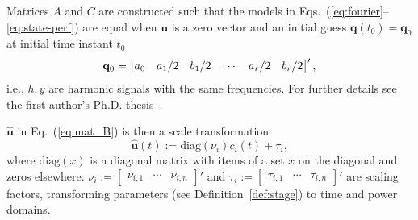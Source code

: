 \documentclass[letterpaper,10pt,journal,twoside]{IEEEtran}
\theoremstyle{definition}
\newtheorem{lem}[thm]{Lemma}
\begin{document}
{\color{blue}Matrices $A$ and $C$ are constructed such that t}he %
models in Eqs.~(\ref{eq:fourier}--\ref{eq:state-perf}) are equal
when $\mathbf{u}$ is a zero vector %
and an initial guess $\mathbf{q}(t_0)=\mathbf{q}_0$ at initial time instant $t_0$
  {\color{blue}\begin{equation}
  {\color{black}\mathbf{q}_0=\begin{bmatrix}a_0 & a_1/2 & b_1/2 & \cdots & a_r/2 & b_r/2\end{bmatrix}',}
  \end{equation}}
i.e., $h,y$ are %
harmonic signals with the same frequencies{\color{blue}. For further details see the first author's Ph.D. thesis~\cite{seewaldphdthesis}}.

$\hat{\mathbf{u}}$ in Eq.~(\ref{eq:mat_B}) is then a scale transformation
\begin{equation}
  \hat{\mathbf{u}}(t):=\mathrm{diag}(\nu_i)c_i(t)+\tau_i,
\end{equation}
where $\mathrm{diag}(x)$ is a diagonal matrix with items of a set $x$ on the diagonal and zeros elsewhere. $\nu_i:=\begin{bmatrix}\nu_{i,1}&\cdots&\nu_{i,n}\end{bmatrix}'$ and $\tau_i:=\begin{bmatrix}\tau_{i,1}&\cdots&\tau_{i,n}\end{bmatrix}'$ are scaling factors{\color{blue},} %
transform{\color{blue}ing} parameters %
(see Definition~\ref{def:stage}) to time and power domains.
\end{document}
